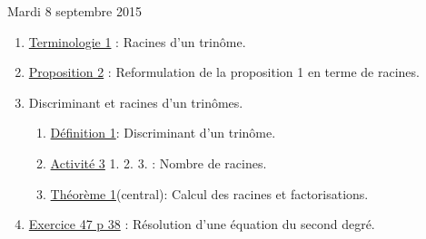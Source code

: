 \documentclass[a4paper,11pt]{article}
\theoremstyle{break}
\begin{document}
  
  Mardi 8 septembre 2015
   \begin{enumerate}   
     \item 
      \href{https://github.com/mathlorgues/math1sd1516/blob/master/20150907/definitions.pdf}
   {Terminologie 1} : Racines d'un trinôme.
      \item 
      \href{https://github.com/mathlorgues/math1sd1516/blob/master/20150907/propositions.pdf}
   {Proposition 2} : Reformulation de la proposition 1 en terme de racines.
    \item Discriminant et racines d'un trinômes.
    \begin{enumerate}
      \item 
      \href{https://github.com/mathlorgues/math1sd1516/blob/master/20150908/definitions.pdf}
   {Définition 1}: Discriminant d'un trinôme.
      \item 
      \href{https://github.com/mathlorgues/math1sd1516/blob/master/20150908/activite.pdf}
   {Activité 3} 1. 2. 3. : Nombre de racines.
      \item 
      \href{https://github.com/mathlorgues/math1sd1516/blob/master/20150908/propositions.pdf}
   {Théorème 1}(central): Calcul des racines et factorisations.
    \end{enumerate}
    \item 
    \href{https://github.com/mathlorgues/math1sd1516/blob/master/images/47-52p38.png}
    {Exercice 47 p 38} : Résolution d'une équation du second degré.
    
    
    
  \end{enumerate}
  
\end{document}
